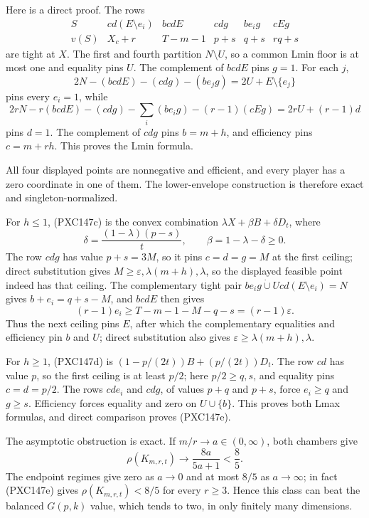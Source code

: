 \documentclass[11pt]{article}
\begin{document}
Here is a direct proof.  The rows
\[
\begin{array}{c|ccccc}
 S&cd(E\setminus e_i)&bcdE&cdg&be_i g&cEg\\ \hline
 v(S)&X_c+r&T-m-1&p+s&q+s&rq+s
\end{array}                                               \tag{PXC147f}
\]
are tight at \(X\).  The first and fourth partition \(N\setminus U\), so a
common Lmin floor is at most one and equality pins \(U\).  The complement
of \(bcdE\) pins \(g=1\).  For each \(j\),
\[
 2N-(bcdE)-(cdg)-(be_jg)=2U+E\setminus\{e_j\}
\]
pins every \(e_i=1\), while
\[
 2rN-r(bcdE)-(cdg)-\sum_i(be_i g)-(r-1)(cEg)
   =2rU+(r-1)d
\]
pins \(d=1\).  The complement of \(cdg\) pins \(b=m+h\), and efficiency
pins \(c=m+rh\).  This proves the Lmin formula.

All four displayed points are nonnegative and efficient, and every player
has a zero coordinate in one of them.  The lower-envelope construction is
therefore exact and singleton-normalized.

For \(h\le1\), (PXC147c) is the convex combination
\(\lambda X+\beta B+\delta D_t\), where
\[
 \delta=\frac{(1-\lambda)(p-s)}{t},\qquad
 \beta=1-\lambda-\delta\ge0.
\]
The row \(cdg\) has value \(p+s=3M\), so it pins \(c=d=g=M\) at the first
ceiling; direct substitution gives
\(M\ge\varepsilon,\lambda(m+h),\lambda\), so the displayed feasible point
indeed has that ceiling.  The complementary tight pair
\(be_i g\mathbin{\dot\cup}Ucd(E\setminus e_i)=N\) gives
\(b+e_i=q+s-M\), and \(bcdE\) then gives
\[
 (r-1)e_i\ge T-m-1-M-q-s=(r-1)\varepsilon.
\]
Thus the next ceiling pins \(E\), after which the complementary equalities
and efficiency pin \(b\) and \(U\); direct substitution also gives
\(\varepsilon\ge\lambda(m+h),\lambda\).

For \(h\ge1\), (PXC147d) is
\((1-p/(2t))B+(p/(2t))D_t\).  The row \(cd\) has value \(p\), so the first
ceiling is at least \(p/2\); here \(p/2\ge q,s\), and equality pins
\(c=d=p/2\).  The rows \(cde_i\) and \(cdg\), of values \(p+q\) and
\(p+s\), force \(e_i\ge q\) and \(g\ge s\).  Efficiency forces equality
and zero on \(U\cup\{b\}\).  This proves both Lmax formulas, and direct
comparison proves (PXC147e).

The asymptotic obstruction is exact.  If \(m/r\to a\in(0,\infty)\), both
chambers give
\begin{equation}
 \rho(K_{m,r,t})\longrightarrow\frac{8a}{5a+1}<\frac85.  \tag{PXC147g}
\end{equation}
The endpoint regimes give zero as \(a\to0\) and at most \(8/5\) as
\(a\to\infty\); in fact (PXC147e) gives \(\rho(K_{m,r,t})<8/5\) for every
\(r\ge3\).  Hence this class can beat the balanced \(G(p,k)\) value, which
tends to two, in only finitely many dimensions.
\end{document}
